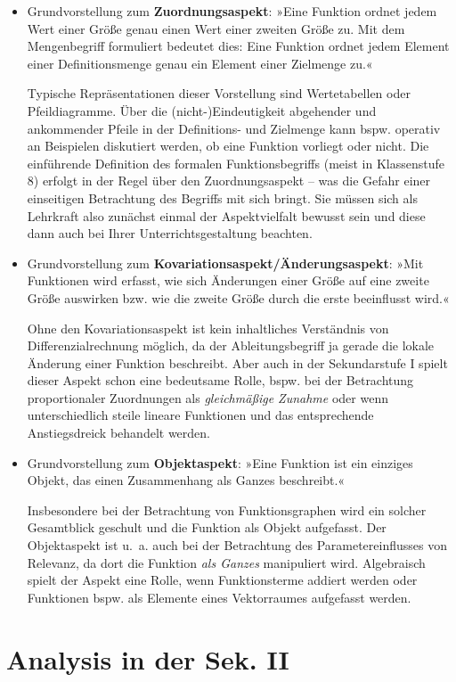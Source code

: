 \documentclass[
  ngerman,
]{scrbook}
\theoremstyle{definition}
\theoremstyle{definition}
\theoremstyle{definition}
\theoremstyle{definition}
\theoremstyle{remark}
\begin{document}
\begin{itemize}
\item
  Grundvorstellung zum \textbf{Zuordnungsaspekt}: »Eine Funktion ordnet jedem Wert einer Größe genau einen Wert einer zweiten Größe zu. Mit dem Mengenbegriff formuliert bedeutet dies: Eine Funktion ordnet jedem Element einer Definitionsmenge genau ein Element einer Zielmenge zu.«

  Typische Repräsentationen dieser Vorstellung sind Wertetabellen oder Pfeildiagramme. Über die (nicht-)Eindeutigkeit abgehender und ankommender Pfeile in der Definitions- und Zielmenge kann bspw. operativ an Beispielen diskutiert werden, ob eine Funktion vorliegt oder nicht. Die einführende Definition des formalen Funktionsbegriffs (meist in Klassenstufe 8) erfolgt in der Regel über den Zuordnungsaspekt -- was die Gefahr einer einseitigen Betrachtung des Begriffs mit sich bringt. Sie müssen sich als Lehrkraft also zunächst einmal der Aspektvielfalt bewusst sein und diese dann auch bei Ihrer Unterrichtsgestaltung beachten.
\item
  Grundvorstellung zum \textbf{Kovariationsaspekt/Änderungsaspekt}: »Mit Funktionen wird erfasst, wie sich Änderungen einer Größe auf eine zweite Größe auswirken bzw. wie die zweite Größe durch die erste beeinflusst wird.«

  Ohne den Kovariationsaspekt ist kein inhaltliches Verständnis von Differenzialrechnung möglich, da der Ableitungsbegriff ja gerade die lokale Änderung einer Funktion beschreibt. Aber auch in der Sekundarstufe I spielt dieser Aspekt schon eine bedeutsame Rolle, bspw. bei der Betrachtung proportionaler Zuordnungen als \emph{gleichmäßige Zunahme} oder wenn unterschiedlich steile lineare Funktionen und das entsprechende Anstiegsdreick behandelt werden.
\item
  Grundvorstellung zum \textbf{Objektaspekt}: »Eine Funktion ist ein einziges Objekt, das einen Zusammenhang als Ganzes beschreibt.«

  Insbesondere bei der Betrachtung von Funktionsgraphen wird ein solcher Gesamtblick geschult und die Funktion als Objekt aufgefasst. Der Objektaspekt ist u.~a. auch bei der Betrachtung des Parametereinflusses von Relevanz, da dort die Funktion \emph{als Ganzes} manipuliert wird. Algebraisch spielt der Aspekt eine Rolle, wenn Funktionsterme addiert werden oder Funktionen bspw. als Elemente eines Vektorraumes aufgefasst werden.
\end{itemize}

\hypertarget{analysis-in-der-sek.-ii}{%
\section{Analysis in der Sek. II}\label{analysis-in-der-sek.-ii}}
\end{document}
